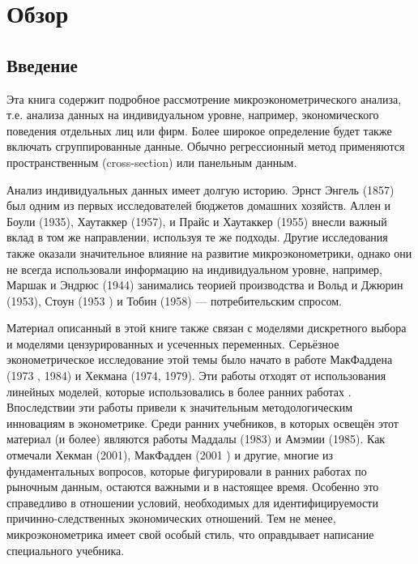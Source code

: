 \chapter{Обзор}

\section{Введение}

Эта книга содержит подробное рассмотрение микроэконометрического анализа, т.е. анализа  данных на индивидуальном уровне, например, экономического поведения отдельных лиц или фирм. Более широкое определение будет также включать сгруппированные данные. Обычно регрессионный метод применяются пространственным (cross-section) или панельным данным.
	
	
Анализ индивидуальных данных имеет долгую историю. Эрнст Энгель (1857) был одним из первых исследователей  бюджетов домашних хозяйств. Аллен и Боули (1935), Хаутаккер (1957), и Прайс и Хаутаккер (1955) внесли важный вклад  в том же направлении, используя те же подходы. Другие исследования также оказали значительное влияние на развитие микроэконометрики, однако они не всегда использовали информацию на индивидуальном уровне, например, Маршак и Эндрюс (1944) занимались  теорией производства и Вольд и Джюрин  (1953), Стоун (1953 ) и Тобин (1958) --- потребительским спросом.
	
	
Материал описанный в этой книге также связан с моделями дискретного выбора и моделями цензурированных и усеченных переменных. Серьёзное эконометрическое исследование этой темы было начато  в работе МакФаддена (1973 , 1984) и Хекмана (1974, 1979). Эти работы отходят от использования линейных моделей, которые использовались в более ранних работах . Впоследствии эти работы привели к значительным методологическим инновациям в эконометрике. Среди ранних учебников, в которых освещён этот материал (и более) являются работы Маддалы (1983) и Амэмии (1985). Как отмечали Хекман (2001), МакФадден (2001 ) и другие, многие из фундаментальных вопросов, которые фигурировали в ранних работах по рыночным данным, остаются важными и в настоящее время. Особенно это справедливо в отношении условий, необходимых для идентифицируемости причинно-следственных экономических отношений. Тем не менее, микроэконометрика имеет свой особый стиль, что оправдывает написание специального учебника.
	
